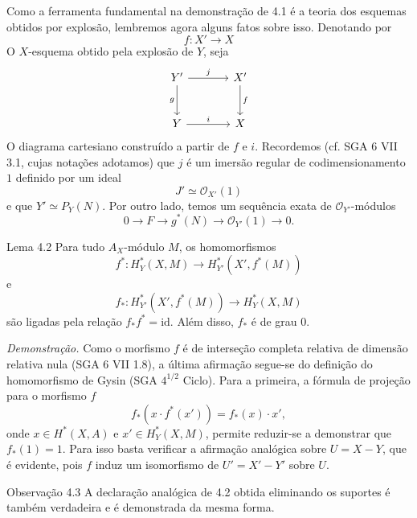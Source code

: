 Como a ferramenta fundamental na demonstração de 4.1 é a teoria dos esquemas obtidos por explosão, lembremos agora alguns fatos sobre isso. Denotando por
\[
f:X'\to X
\]
O $X$-esquema obtido pela explosão de $Y$, seja
\[
\begin{tikzcd}[column sep=large,row sep=large]
Y' \arrow[r,"j"] \arrow[d,"g"'] & X' \arrow[d,"f"]\\
Y \arrow[r,"i"] & X
\end{tikzcd}
\]
O diagrama cartesiano construído a partir de $f$ e $i$. Recordemos (cf. SGA 6 VII 3.1, cujas notações adotamos) que $j$ é um imersão regular de codimensionamento $1$ definido por um ideal
\[
J'\simeq\mathcal O_{X'}(1)
\]
e que $Y'\simeq P_Y(N)$. Por outro lado, temos um sequência exata de $\mathcal O_{Y'}$-módulos
\[
0\to F\to g^*(N)\to \mathcal O_{Y'}(1)\to0.
\]

\begin{statement}{Lema 4.2}
Para tudo $A_X$-módulo $M$, os homomorfismos
\[
f^*:H_Y^*(X,M)\to H_{Y'}^*(X',f^*(M))
\]
e
\[
f_*:H_{Y'}^*(X',f^*(M))\to H_Y^*(X,M)
\]
são ligadas pela relação $f_*f^*=\mathrm{id}$. Além disso, $f_*$ é de grau $0$.
\end{statement}

\emph{Demonstração.} Como o morfismo $f$ é de interseção completa relativa de dimensão relativa nula (SGA 6 VII 1.8), a última afirmação segue-se do definição do homomorfismo de Gysin (SGA $4^{1/2}$ Ciclo). Para a primeira, a fórmula de projeção para o morfismo $f$
\[
f_*(x\cdot f^*(x'))=f_*(x)\cdot x',
\]
onde $x\in H^*(X,A)$ e $x'\in H_Y^*(X,M)$, permite reduzir-se a demonstrar que $f_*(1)=1$. Para isso basta verificar a afirmação analógica sobre $U=X-Y$, que é evidente, pois $f$ induz um isomorfismo de $U'=X'-Y'$ sobre $U$.

\begin{statement}{Observação 4.3}
A declaração analógica de 4.2 obtida eliminando os suportes é também verdadeira e é demonstrada da mesma forma.
\end{statement}
